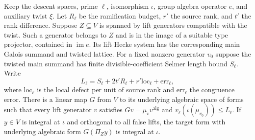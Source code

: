\begin{lemma}
\label{lem:c-one-generator-denominator}
\emitthmsource
Keep the descent spaces, prime $\ell$, isomorphism $\iota$, group algebra operator $e$, and auxiliary twist $\xi$. Let $R_\ell$ be the ramification budget, $r'$ the source rank, and $t'$ the rank difference.
Suppose $Z\subseteq V$ is spanned by lift generators compatible with the twist. Such a generator belongs to $Z$ and is in the image of a suitable type projector, contained in $\operatorname{im}e$. Its lift Hecke system has the corresponding main Galois summand and twisted lattice.
For a fixed nonzero generator $v_0$ suppose the twisted main summand has finite divisible-coefficient Selmer length bound $S_\ell$. Write
\[
 L_\ell=S_\ell+2t'R_\ell+r'\mathrm{loc}_\ell+\mathrm{err}_\ell ,
\]
where $\mathrm{loc}_\ell$ is the local defect per unit of source rank and $\mathrm{err}_\ell$ the congruence error.
There is a linear map $G$ from $V$ to its underlying algebraic space of forms such that every lift generator $v$ satisfies $Gv=\mu_v v^{\mathrm{alg}}$ and $v_\ell(\iota(\mu_{v_0}))\le L_\ell$.
If $y\in V$ is integral at $\iota$ and orthogonal to all false lifts, the target form with underlying algebraic form $G(\Pi_Zy)$ is integral at $\iota$.
\end{lemma}

